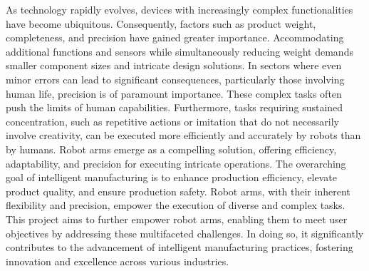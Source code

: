 As technology rapidly evolves, devices with increasingly complex functionalities have become ubiquitous. Consequently, factors such as product weight, completeness, and precision have gained greater importance. Accommodating additional functions and sensors while simultaneously reducing weight demands smaller component sizes and intricate design solutions. In sectors where even minor errors can lead to significant consequences, particularly those involving human life, precision is of paramount importance. These complex tasks often push the limits of human capabilities. Furthermore, tasks requiring sustained concentration, such as repetitive actions or imitation that do not necessarily involve creativity, can be executed more efficiently and accurately by robots than by humans. Robot arms emerge as a compelling solution, offering efficiency, adaptability, and precision for executing intricate operations. The overarching goal of intelligent manufacturing is to enhance production efficiency, elevate product quality, and ensure production safety. Robot arms, with their inherent flexibility and precision, empower the execution of diverse and complex tasks. This project aims to further empower robot arms, enabling them to meet user objectives by addressing these multifaceted challenges. In doing so, it significantly contributes to the advancement of intelligent manufacturing practices, fostering innovation and excellence across various industries.